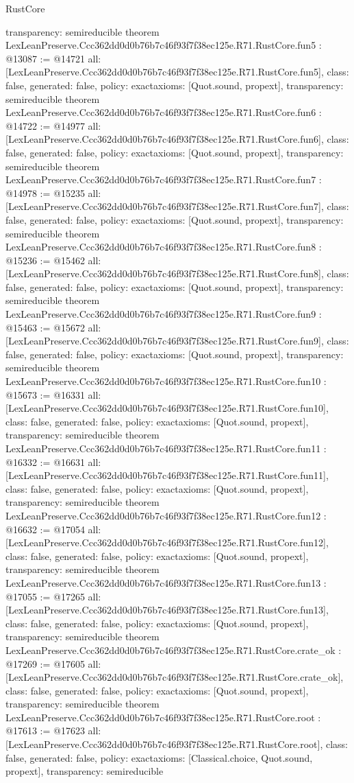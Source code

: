 \begin{lexlean}{RustCore}
\begin{coremodule}
{  transparency: semireducible
}
theorem LexLeanPreserve.Ccc362dd0d0b76b7c46f93f7f38ec125e.R71.RustCore.fun5 : @13087 := @14721 {
  all: [LexLeanPreserve.Ccc362dd0d0b76b7c46f93f7f38ec125e.R71.RustCore.fun5],
  class: false,
  generated: false,
  policy: exact{axioms: [Quot.sound, propext]},
  transparency: semireducible
}
theorem LexLeanPreserve.Ccc362dd0d0b76b7c46f93f7f38ec125e.R71.RustCore.fun6 : @14722 := @14977 {
  all: [LexLeanPreserve.Ccc362dd0d0b76b7c46f93f7f38ec125e.R71.RustCore.fun6],
  class: false,
  generated: false,
  policy: exact{axioms: [Quot.sound, propext]},
  transparency: semireducible
}
theorem LexLeanPreserve.Ccc362dd0d0b76b7c46f93f7f38ec125e.R71.RustCore.fun7 : @14978 := @15235 {
  all: [LexLeanPreserve.Ccc362dd0d0b76b7c46f93f7f38ec125e.R71.RustCore.fun7],
  class: false,
  generated: false,
  policy: exact{axioms: [Quot.sound, propext]},
  transparency: semireducible
}
theorem LexLeanPreserve.Ccc362dd0d0b76b7c46f93f7f38ec125e.R71.RustCore.fun8 : @15236 := @15462 {
  all: [LexLeanPreserve.Ccc362dd0d0b76b7c46f93f7f38ec125e.R71.RustCore.fun8],
  class: false,
  generated: false,
  policy: exact{axioms: [Quot.sound, propext]},
  transparency: semireducible
}
theorem LexLeanPreserve.Ccc362dd0d0b76b7c46f93f7f38ec125e.R71.RustCore.fun9 : @15463 := @15672 {
  all: [LexLeanPreserve.Ccc362dd0d0b76b7c46f93f7f38ec125e.R71.RustCore.fun9],
  class: false,
  generated: false,
  policy: exact{axioms: [Quot.sound, propext]},
  transparency: semireducible
}
theorem LexLeanPreserve.Ccc362dd0d0b76b7c46f93f7f38ec125e.R71.RustCore.fun10 : @15673 := @16331 {
  all: [LexLeanPreserve.Ccc362dd0d0b76b7c46f93f7f38ec125e.R71.RustCore.fun10],
  class: false,
  generated: false,
  policy: exact{axioms: [Quot.sound, propext]},
  transparency: semireducible
}
theorem LexLeanPreserve.Ccc362dd0d0b76b7c46f93f7f38ec125e.R71.RustCore.fun11 : @16332 := @16631 {
  all: [LexLeanPreserve.Ccc362dd0d0b76b7c46f93f7f38ec125e.R71.RustCore.fun11],
  class: false,
  generated: false,
  policy: exact{axioms: [Quot.sound, propext]},
  transparency: semireducible
}
theorem LexLeanPreserve.Ccc362dd0d0b76b7c46f93f7f38ec125e.R71.RustCore.fun12 : @16632 := @17054 {
  all: [LexLeanPreserve.Ccc362dd0d0b76b7c46f93f7f38ec125e.R71.RustCore.fun12],
  class: false,
  generated: false,
  policy: exact{axioms: [Quot.sound, propext]},
  transparency: semireducible
}
theorem LexLeanPreserve.Ccc362dd0d0b76b7c46f93f7f38ec125e.R71.RustCore.fun13 : @17055 := @17265 {
  all: [LexLeanPreserve.Ccc362dd0d0b76b7c46f93f7f38ec125e.R71.RustCore.fun13],
  class: false,
  generated: false,
  policy: exact{axioms: [Quot.sound, propext]},
  transparency: semireducible
}
theorem LexLeanPreserve.Ccc362dd0d0b76b7c46f93f7f38ec125e.R71.RustCore.crate_ok : @17269 := @17605 {
  all: [LexLeanPreserve.Ccc362dd0d0b76b7c46f93f7f38ec125e.R71.RustCore.crate_ok],
  class: false,
  generated: false,
  policy: exact{axioms: [Quot.sound, propext]},
  transparency: semireducible
}
theorem LexLeanPreserve.Ccc362dd0d0b76b7c46f93f7f38ec125e.R71.RustCore.root : @17613 := @17623 {
  all: [LexLeanPreserve.Ccc362dd0d0b76b7c46f93f7f38ec125e.R71.RustCore.root],
  class: false,
  generated: false,
  policy: exact{axioms: [Classical.choice, Quot.sound, propext]},
  transparency: semireducible
}


\end{coremodule}
\end{lexlean}
